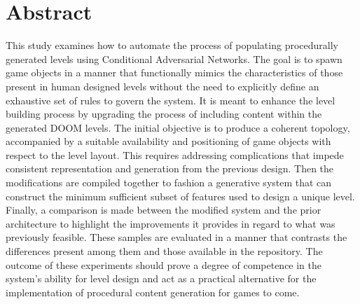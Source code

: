 \documentclass{Configuration_Files/PoliMi3i_thesis}
\begin{document}


\pagestyle{empty} %
\frontmatter %


\startpreamble
\setcounter{page}{1} %

\chapter*{Abstract} 
This study examines how to automate the process of populating procedurally 
generated levels using Conditional Adversarial Networks. The goal is to spawn 
game objects in a manner that functionally mimics the characteristics of those present 
in human designed levels without the need to explicitly define an exhaustive set of
rules to govern the system. It is meant to enhance the level building process by 
upgrading the process of including content within the generated DOOM levels. The initial 
objective is to produce a coherent topology, accompanied by a suitable availability and 
positioning of game objects with respect to the level layout. This requires addressing 
complications that impede consistent representation and generation from the previous 
design. Then the modifications are compiled together to fashion a generative system 
that can construct the minimum sufficient subset of features used to design a unique level. 
Finally, a comparison is made between the modified system and the prior architecture to 
highlight the improvements it provides in regard to what was previously feasible.
These samples are evaluated in a manner that contrasts the differences present 
among them and those available in the repository. The outcome of these experiments 
should prove a degree of competence in the system’s ability for level design and act 
as a practical alternative for the implementation of procedural content generation for 
games to come.
\\
\\
\end{document}
